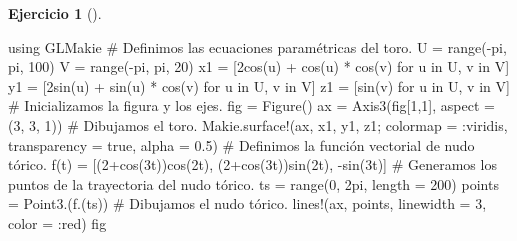 \documentclass[
  a4paper,
]{scrreport}
\newenvironment{Shaded}{\begin{snugshade}}{\end{snugshade}}
\newcommand{\BuiltInTok}[1]{\textcolor[rgb]{0.00,0.23,0.31}{#1}}
\newcommand{\CommentTok}[1]{\textcolor[rgb]{0.37,0.37,0.37}{#1}}
\newcommand{\ConstantTok}[1]{\textcolor[rgb]{0.56,0.35,0.01}{#1}}
\newcommand{\FloatTok}[1]{\textcolor[rgb]{0.68,0.00,0.00}{#1}}
\newcommand{\FunctionTok}[1]{\textcolor[rgb]{0.28,0.35,0.67}{#1}}
\newcommand{\ImportTok}[1]{\textcolor[rgb]{0.00,0.46,0.62}{#1}}
\newcommand{\KeywordTok}[1]{\textcolor[rgb]{0.00,0.23,0.31}{#1}}
\newcommand{\NormalTok}[1]{\textcolor[rgb]{0.00,0.23,0.31}{#1}}
\newcommand{\OperatorTok}[1]{\textcolor[rgb]{0.37,0.37,0.37}{#1}}
\theoremstyle{definition}
\newtheorem{exercise}{Ejercicio}[chapter]
\theoremstyle{remark}
\begin{document}
\begin{exercise}[]
\begin{enumerate}
\begin{tcolorbox}
\begin{Shaded}
\begin{Highlighting}[]
\ImportTok{using} \BuiltInTok{GLMakie}
\CommentTok{\# Definimos las ecuaciones paramétricas del toro.}
\NormalTok{U }\OperatorTok{=} \FunctionTok{range}\NormalTok{(}\OperatorTok{{-}}\ConstantTok{pi}\NormalTok{, }\ConstantTok{pi}\NormalTok{, }\FloatTok{100}\NormalTok{)}
\NormalTok{V }\OperatorTok{=} \FunctionTok{range}\NormalTok{(}\OperatorTok{{-}}\ConstantTok{pi}\NormalTok{, }\ConstantTok{pi}\NormalTok{, }\FloatTok{20}\NormalTok{)}
\NormalTok{x1 }\OperatorTok{=}\NormalTok{ [}\FloatTok{2}\FunctionTok{cos}\NormalTok{(u) }\OperatorTok{+} \FunctionTok{cos}\NormalTok{(u) }\OperatorTok{*} \FunctionTok{cos}\NormalTok{(v) for u }\KeywordTok{in}\NormalTok{ U, v }\KeywordTok{in}\NormalTok{ V]}
\NormalTok{y1 }\OperatorTok{=}\NormalTok{ [}\FloatTok{2}\FunctionTok{sin}\NormalTok{(u) }\OperatorTok{+} \FunctionTok{sin}\NormalTok{(u) }\OperatorTok{*} \FunctionTok{cos}\NormalTok{(v) for u }\KeywordTok{in}\NormalTok{ U, v }\KeywordTok{in}\NormalTok{ V]}
\NormalTok{z1 }\OperatorTok{=}\NormalTok{ [}\FunctionTok{sin}\NormalTok{(v) for u }\KeywordTok{in}\NormalTok{ U, v }\KeywordTok{in}\NormalTok{ V]}
\CommentTok{\# Inicializamos la figura y los ejes.}
\NormalTok{fig }\OperatorTok{=} \FunctionTok{Figure}\NormalTok{()}
\NormalTok{ax }\OperatorTok{=} \FunctionTok{Axis3}\NormalTok{(fig[}\FloatTok{1}\NormalTok{,}\FloatTok{1}\NormalTok{], aspect }\OperatorTok{=}\NormalTok{ (}\FloatTok{3}\NormalTok{, }\FloatTok{3}\NormalTok{, }\FloatTok{1}\NormalTok{))}
\CommentTok{\# Dibujamos el toro.}
\NormalTok{Makie.}\FunctionTok{surface!}\NormalTok{(ax, x1, y1, z1; colormap }\OperatorTok{=} \OperatorTok{:}\NormalTok{viridis, transparency }\OperatorTok{=} \ConstantTok{true}\NormalTok{, alpha }\OperatorTok{=} \FloatTok{0.5}\NormalTok{)}
\CommentTok{\# Definimos la función vectorial de nudo tórico.}
\FunctionTok{f}\NormalTok{(t) }\OperatorTok{=}\NormalTok{ [(}\FloatTok{2}\FunctionTok{+cos}\NormalTok{(}\FloatTok{3}\NormalTok{t))}\FunctionTok{cos}\NormalTok{(}\FloatTok{2}\NormalTok{t), (}\FloatTok{2}\FunctionTok{+cos}\NormalTok{(}\FloatTok{3}\NormalTok{t))}\FunctionTok{sin}\NormalTok{(}\FloatTok{2}\NormalTok{t), }\FunctionTok{{-}sin}\NormalTok{(}\FloatTok{3}\NormalTok{t)] }
\CommentTok{\# Generamos los puntos de la trayectoria del nudo tórico.}
\NormalTok{ts }\OperatorTok{=} \FunctionTok{range}\NormalTok{(}\FloatTok{0}\NormalTok{, }\FloatTok{2}\NormalTok{pi, length }\OperatorTok{=} \FloatTok{200}\NormalTok{)}
\NormalTok{points }\OperatorTok{=} \FunctionTok{Point3}\NormalTok{.(}\FunctionTok{f}\NormalTok{.(ts))}
\CommentTok{\# Dibujamos el nudo tórico.}
\FunctionTok{lines!}\NormalTok{(ax, points, linewidth }\OperatorTok{=} \FloatTok{3}\NormalTok{, color }\OperatorTok{=} \OperatorTok{:}\NormalTok{red)}
\NormalTok{fig}
\end{Highlighting}
\end{Shaded}


\end{tcolorbox}
\end{enumerate}
\end{exercise}
\end{document}
